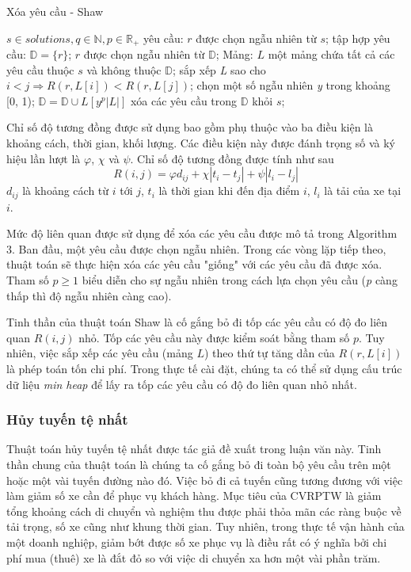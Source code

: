 \begin{algorithm}
	\caption{Xóa yêu cầu - Shaw}
	\begin{algorithmic}[1]
		\Require $s \in {solutions}, q \in \mathbb{N}, p \in \mathbb{R}_{+}$
		\State yêu cầu: $r$ được chọn ngẫu nhiên từ $s$;
		\State tập hợp yêu cầu: $\mathbb{D}=\{r\}$;
		\State $r$ được chọn ngẫu nhiên từ $\mathbb{D}$;
		\State Mảng: $L$ một mảng chứa tất cả các yêu cầu thuộc $s$ và không thuộc $\mathbb{D}$;
		\State sắp xếp \textit{L} sao cho $i<j \Rightarrow R(r, L\left[ i \right]) < R(r, L\left[ j \right])$;
		\State chọn một số ngẫu nhiên \textit{y} trong khoảng [0, 1);
		\State $\mathbb{D}=\mathbb{D}\cup {L \left[ y^p|L| \right]}$
		\EndWhile
		\State xóa các yêu cầu trong $\mathbb{D}$ khỏi $s$;
	\end{algorithmic}
\end{algorithm}

Chỉ số độ tương đồng được sử dụng bao gồm phụ thuộc vào ba điều kiện là khoảng cách, thời gian, khối lượng. Các điều kiện này được đánh trọng số và ký hiệu lần lượt là $\varphi$, $\chi$ và $\psi$. Chỉ số độ tương đồng được tính như sau
\begin{equation}
	\label{eq:shaw_related}
	R(i,j) = \varphi d_{ij} + \chi |t_{i}-t_{j}| + \psi|l_i - l_j|
\end{equation}
$d_{ij}$ là khoảng cách từ $i$ tới $j$, $t_i$ là thời gian khi đến địa điểm $i$, $l_i$ là tải của xe tại $i$.

Mức độ liên quan được sử dụng để xóa các yêu cầu được mô tả trong Algorithm 3. Ban đầu, một yêu cầu được chọn ngẫu nhiên. Trong các vòng lặp tiếp theo, thuật toán sẽ thực hiện xóa các yêu cầu "giống" với các yêu cầu đã được xóa. Tham số $p \geqslant 1$ biểu diễn cho sự ngẫu nhiên trong cách lựa chọn yêu cầu (\textit{p} càng thấp thì độ ngẫu nhiên càng cao).

Tinh thần của thuật toán Shaw là cố gắng bỏ đi tốp các yêu cầu có độ đo liên quan $R(i,j)$ nhỏ. Tốp các yêu cầu này được kiểm soát bằng tham số $p$. Tuy nhiên, việc sắp xếp các yêu cầu (mảng $L$) theo thứ tự tăng dần của $R(r, L[i])$ là phép toán tốn chi phí. Trong thực tế cài đặt, chúng ta có thể sử dụng cấu trúc dữ liệu \textit{min heap} để lấy ra tốp các yêu cầu có độ đo liên quan nhỏ nhất.

\subsubsection*{Hủy tuyến tệ nhất}
Thuật toán hủy tuyến tệ nhất được tác giả đề xuất trong luận văn này. Tinh thần chung của thuật toán là chúng ta cố gắng bỏ đi toàn bộ yêu cầu trên một hoặc một vài tuyến đường nào đó. Việc bỏ đi cả tuyến cũng tương đương với việc làm giảm số xe cần để phục vụ khách hàng. Mục tiêu của CVRPTW là giảm tổng khoảng cách di chuyển và nghiệm thu được phải thỏa mãn các ràng buộc về tải trọng, số xe cũng như khung thời gian. Tuy nhiên, trong thực tế vận hành của một doanh nghiệp, giảm bớt được số xe phục vụ là điều rất có ý nghĩa bởi chi phí mua (thuê) xe là đắt đỏ so với việc di chuyển xa hơn một vài phần trăm.

